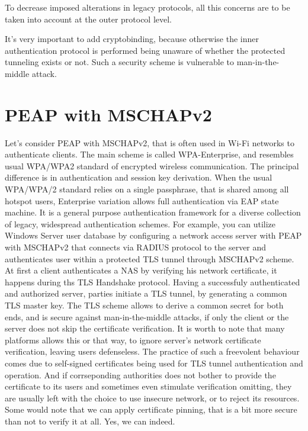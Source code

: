 \documentclass{amsart}
\begin{document}
To decrease imposed alterations in legacy protocols,
all this concerns are to be taken into account
at the outer protocol level.

It's very important to add cryptobinding,
because otherwise the inner authentication protocol is performed
being unaware of whether the protected tunneling exists or not.
Such a security scheme is vulnerable to man-in-the-middle attack.

\section{PEAP with MSCHAPv2}

Let's consider PEAP with MSCHAPv2, that is often used
in Wi-Fi networks to authenticate clients.
The main scheme is called WPA-Enterprise,
and resembles usual WPA/WPA2 standard of encrypted wireless communication.
The principal difference is in authentication and session key derivation.
When the usual WPA/WPA/2 standard relies on a single passphrase,
that is shared among all hotspot users,
Enterprise variation allows full authentication via EAP state machine.
It is a general purpose authentication framework for a diverse collection
of legacy, widespread authentication schemes.
For example, you can utilize Windows Server user database
by configuring a network access server with PEAP with MSCHAPv2
that connects via RADIUS protocol to the server and authenticates user
within a protected TLS tunnel
through MSCHAPv2 scheme.
At first a client
authenticates a NAS by verifying his network certificate,
it happens during ths TLS Handshake protocol.
Having a successfuly authenticated and authorized server, parties initiate a TLS tunnel,
by generating a common TLS master key.
The TLS scheme allows to derive
a common secret for both ends, and is secure against
man-in-the-middle attacks,
if only the client or the server does not skip the certificate
verification.
It is worth to note that many platforms
allows this or that way, to ignore server's network certificate verification,
leaving users defenseless.
The practice of such a freevolent behaviour comes due to self-signed certificates
being used for TLS tunnel authentication and operation.
And if corrseponding authorities does not bother
to provide the certificate to its users
and sometimes even stimulate verification omitting,
they are usually left with the choice to use insecure network,
or to reject its resources.
Some would note that we can apply certificate pinning,
that is a bit more secure than not to verify it at all. Yes, we can indeed.
\end{document}
